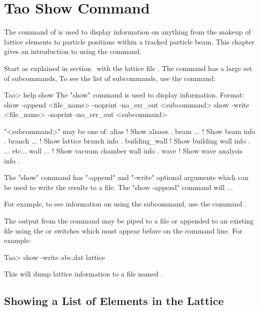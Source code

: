 \documentclass{hitec}     %
\newcommand{\Section}[1]{\section{#1}\vspace*{-1ex}}
\begin{document}
\newpage

\Section{Tao Show Command}
\label{s:show}

The  command of \tao is used to display information on anything from the makeup of lattice
elements to particle positions within a tracked particle beam. This chapter gives an introduction to
using the  command.

Start \tao as explained in section~ with the lattice file . The 
command has a large set of subcommands, To see the list of subcommands, use the  command:
\begin{code}
Tao> help show
The "show" command is used to display information.
Format:
  show {-append <file_name>} {-noprint} {-no_err_out} <subcommand>
  show {-write <file_name>} {-noprint} {-no_err_out} <subcommand>

"<subcommand>" may be one of:
  alias                 ! Show aliases .
  beam ...              ! Show beam info .
  branch ...            ! Show lattice branch info .
  building_wall         ! Show building wall info .
  ... etc...
  wall ...              ! Show vacuum chamber wall info .
  wave                  ! Show wave analysis info .

The "show" command has "-append" and "-write" optional arguments which can be
used to write the results to a file.  The "show -append" command will ...
\end{code}

For example, to see information on using the  subcommand, use the command
.

The output from the  command may be piped to a file or appended to an existing file
using the  or  switches which must appear before  on the
command line. For example:
\begin{code}
Tao> show -write abc.dat lattice
\end{code}
This will dump lattice information to a file named .

\subsection{Showing a List of Elements in the Lattice}
\end{document}
